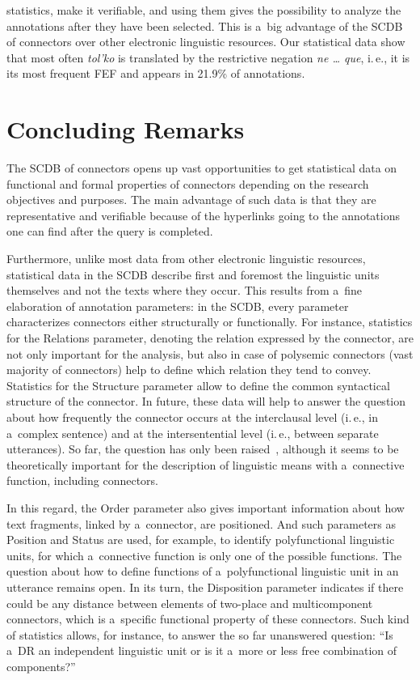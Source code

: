 \begin{multicols}{2}

\noindent 
statistics, make it verifiable, and using them gives the possibility to analyze the 
annotations after they have been selected. This is a~big advantage of the SCDB of 
connectors over other electronic linguistic resources. Our statistical data show that 
most often \textit{tol'ko} is translated by the restrictive negation \textit{ne \ldots 
que}, i.\,e., it is its most frequent FEF and appears in 21.9\% of annotations.

\section{Concluding Remarks}

\noindent
The SCDB of connectors opens up vast opportunities to get statistical data on 
functional and formal properties of connectors depending on the research 
objectives and purposes. The main advantage of such data is that they are 
representative and verifiable because of the hyperlinks going to the annotations one 
can find after the query is completed.

  Furthermore, unlike most data from other electronic linguistic resources, 
statistical data in the SCDB describe first and foremost the linguistic units 
themselves and not the texts where they occur. This results from a~fine elaboration 
of annotation parameters: in the SCDB, every parameter characterizes connectors 
either structurally or functionally. For instance, statistics for the Relations 
parameter, denoting the relation expressed by the connector, are not only important 
for the analysis, but also in case of polysemic connectors (vast majority of 
connectors) help to define which relation they tend to convey. Statistics for the 
Structure parameter allow to define the common syntactical structure of the 
connector. In future, these data will help to answer the question about how 
frequently the connector occurs at the interclausal level (i.\,e., in a~complex 
sentence) and at the intersentential level (i.\,e., between separate utterances). So 
far, the question has only been raised~\cite{16-in}, although it seems to be 
theoretically important for the description of linguistic means with a~connective 
function, including connectors.
  
  In this regard, the Order parameter also gives important information about how 
text fragments, linked by a~connector, are positioned. And such parameters as 
Position and Status are used, for example, to identify polyfunctional linguistic 
units, for which a~connective function is only one of the possible functions. The 
question about how to define functions of a~polyfunctional linguistic unit in an 
utterance remains open. In its turn, the Disposition parameter indicates if there 
could be any distance between elements of two-place and multicomponent 
connectors, which is a~specific functional property of these connectors. Such kind 
of statistics allows, for instance, to answer the so far unanswered question: ``Is 
a~DR an independent linguistic unit or is it a~more or less free combination of 
components?''
  

\end{multicols}
